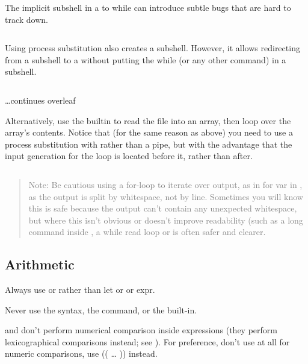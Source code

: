 \documentclass{article}
\begin{document}
The implicit subshell in a  to while can introduce subtle bugs that are hard to track down.

\inputminted[frame=single,firstline=342, lastline=350,linenos]{bash}{./styleguide.bash}

Using process substitution also creates a subshell. However, it allows redirecting from a subshell to a  without putting the while (or any other command) in a subshell.

\inputminted[frame=single,firstline=352, lastline=360,linenos]{bash}{./styleguide.bash}

\begin{center}
\vspace{6em}
\ldots continues overleaf    
\end{center}
\newpage
Alternatively, use the  builtin to read the file into an array, then loop over the array’s contents. Notice that (for the same reason as above) you need to use a process substitution with  rather than a pipe, but with the advantage that the input generation for the loop is located before it, rather than after.

\inputminted[frame=single,firstline=362, lastline=369,linenos]{bash}{./styleguide.bash}
\begin{quote}
    \textcolor{gray}{Note: Be cautious using a for-loop to iterate over output, as in for var in , as the output is split by whitespace, not by line. Sometimes you will know this is safe because the output can’t contain any unexpected whitespace, but where this isn’t obvious or doesn’t improve readability (such as a long command inside , a while read loop or  is often safer and clearer.}
\end{quote}

\subsection{Arithmetic}
\label{subsec:arth}
Always use  or  rather than let or \code{\$[ … ]} or expr.

Never use the \code{\$[ … ]} syntax, the  command, or the  built-in.

\code{<} and \code{>} don’t perform numerical comparison inside \code{[[ … ]]} expressions (they perform lexicographical comparisons instead; see ). For preference, don’t use \code{[[ … ]]} at all for numeric comparisons, use (( … )) instead.
\end{document}

